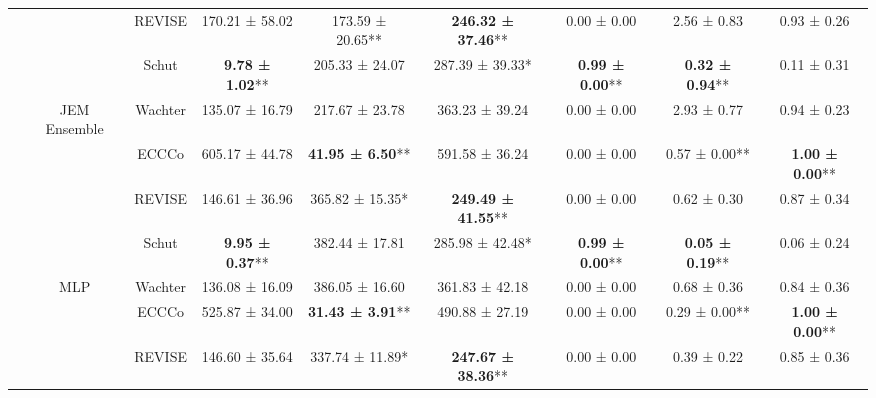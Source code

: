\begin{table}
{\begin{tabular}[t]{ccccccccc}
 &  & REVISE & 170.21 ± 58.02\hphantom{*}\hphantom{*} & 173.59 ± 20.65** & \textbf{246.32 ± 37.46}** & 0.00 ± 0.00\hphantom{*}\hphantom{*} & 2.56 ± 0.83\hphantom{*}\hphantom{*} & 0.93 ± 0.26\hphantom{*}\hphantom{*}\\

 &  & Schut & \textbf{9.78 ± 1.02}** & 205.33 ± 24.07\hphantom{*}\hphantom{*} & 287.39 ± 39.33*\hphantom{*} & \textbf{0.99 ± 0.00}** & \textbf{0.32 ± 0.94}** & 0.11 ± 0.31\hphantom{*}\hphantom{*}\\

 & \multirow[t]{-4}{*}{\centering\arraybackslash JEM Ensemble} & Wachter & 135.07 ± 16.79\hphantom{*}\hphantom{*} & 217.67 ± 23.78\hphantom{*}\hphantom{*} & 363.23 ± 39.24\hphantom{*}\hphantom{*} & 0.00 ± 0.00\hphantom{*}\hphantom{*} & 2.93 ± 0.77\hphantom{*}\hphantom{*} & 0.94 ± 0.23\hphantom{*}\hphantom{*}\\
\cmidrule{2-9}
 &  & ECCCo & 605.17 ± 44.78\hphantom{*}\hphantom{*} & \textbf{41.95 ± 6.50}** & 591.58 ± 36.24\hphantom{*}\hphantom{*} & 0.00 ± 0.00\hphantom{*}\hphantom{*} & 0.57 ± 0.00** & \textbf{1.00 ± 0.00}**\\

 &  & REVISE & 146.61 ± 36.96\hphantom{*}\hphantom{*} & 365.82 ± 15.35*\hphantom{*} & \textbf{249.49 ± 41.55}** & 0.00 ± 0.00\hphantom{*}\hphantom{*} & 0.62 ± 0.30\hphantom{*}\hphantom{*} & 0.87 ± 0.34\hphantom{*}\hphantom{*}\\

 &  & Schut & \textbf{9.95 ± 0.37}** & 382.44 ± 17.81\hphantom{*}\hphantom{*} & 285.98 ± 42.48*\hphantom{*} & \textbf{0.99 ± 0.00}** & \textbf{0.05 ± 0.19}** & 0.06 ± 0.24\hphantom{*}\hphantom{*}\\

 & \multirow[t]{-4}{*}{\centering\arraybackslash MLP} & Wachter & 136.08 ± 16.09\hphantom{*}\hphantom{*} & 386.05 ± 16.60\hphantom{*}\hphantom{*} & 361.83 ± 42.18\hphantom{*}\hphantom{*} & 0.00 ± 0.00\hphantom{*}\hphantom{*} & 0.68 ± 0.36\hphantom{*}\hphantom{*} & 0.84 ± 0.36\hphantom{*}\hphantom{*}\\
\cmidrule{2-9}
 &  & ECCCo & 525.87 ± 34.00\hphantom{*}\hphantom{*} & \textbf{31.43 ± 3.91}** & 490.88 ± 27.19\hphantom{*}\hphantom{*} & 0.00 ± 0.00\hphantom{*}\hphantom{*} & 0.29 ± 0.00** & \textbf{1.00 ± 0.00}**\\

 &  & REVISE & 146.60 ± 35.64\hphantom{*}\hphantom{*} & 337.74 ± 11.89*\hphantom{*} & \textbf{247.67 ± 38.36}** & 0.00 ± 0.00\hphantom{*}\hphantom{*} & 0.39 ± 0.22\hphantom{*}\hphantom{*} & 0.85 ± 0.36\hphantom{*}\hphantom{*}\\


\end{tabular}}
\end{table}
